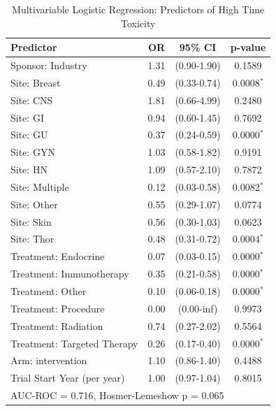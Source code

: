 \begin{table}[htbp]
\centering
\caption{Multivariable Logistic Regression: Predictors of High Time Toxicity}
\begin{tabular}{lccc}
\toprule
Predictor & OR & 95\% CI & p-value \\
\midrule
Sponsor: Industry & 1.31 & (0.90-1.90) & 0.1589 \\
Site: Breast & 0.49 & (0.33-0.74) & 0.0008$^*$ \\
Site: CNS & 1.81 & (0.66-4.99) & 0.2480 \\
Site: GI & 0.94 & (0.60-1.45) & 0.7692 \\
Site: GU & 0.37 & (0.24-0.59) & 0.0000$^*$ \\
Site: GYN & 1.03 & (0.58-1.82) & 0.9191 \\
Site: HN & 1.09 & (0.57-2.10) & 0.7872 \\
Site: Multiple & 0.12 & (0.03-0.58) & 0.0082$^*$ \\
Site: Other & 0.55 & (0.29-1.07) & 0.0774 \\
Site: Skin & 0.56 & (0.30-1.03) & 0.0623 \\
Site: Thor & 0.48 & (0.31-0.72) & 0.0004$^*$ \\
Treatment: Endocrine & 0.07 & (0.03-0.15) & 0.0000$^*$ \\
Treatment: Immunotherapy & 0.35 & (0.21-0.58) & 0.0000$^*$ \\
Treatment: Other & 0.10 & (0.06-0.18) & 0.0000$^*$ \\
Treatment: Procedure & 0.00 & (0.00-inf) & 0.9973 \\
Treatment: Radiation & 0.74 & (0.27-2.02) & 0.5564 \\
Treatment: Targeted Therapy & 0.26 & (0.17-0.40) & 0.0000$^*$ \\
Arm: intervention & 1.10 & (0.86-1.40) & 0.4488 \\
Trial Start Year (per year) & 1.00 & (0.97-1.04) & 0.8015 \\
\bottomrule
\multicolumn{4}{l}{\footnotesize AUC-ROC = 0.716, Hosmer-Lemeshow p = 0.065} \\
\end{tabular}
\end{table}
